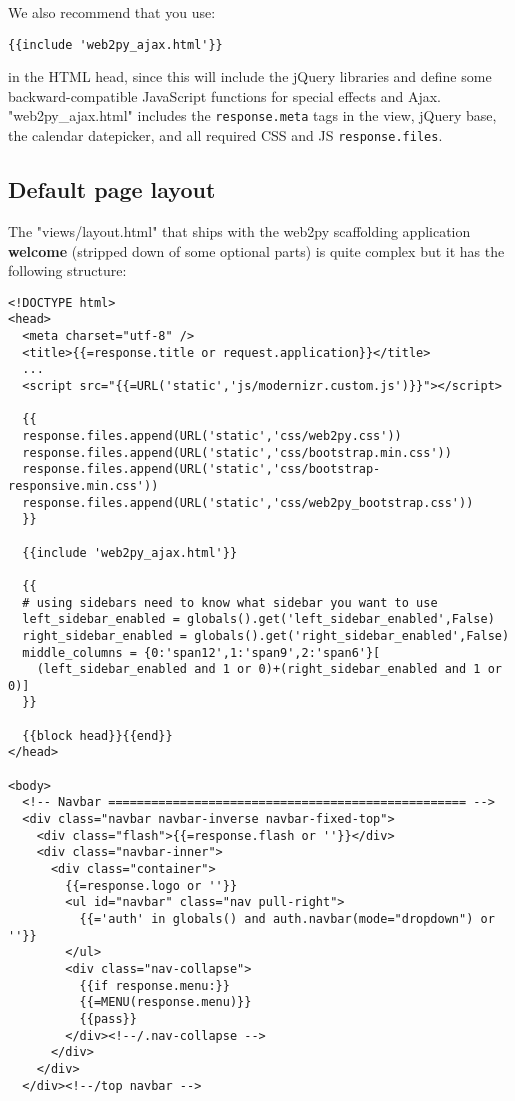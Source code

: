 \documentclass[justified,sixbynine,notoc]{tufte-book}
\def\ft{\small\tt}
\def\inxx#1{\index{#1}}
\begin{document}
\begin{fullwidth}
We also recommend that you use:

\begin{lstlisting}[keywords={}]
{{include 'web2py_ajax.html'}}
\end{lstlisting}
\noindent in the HTML head, since this will include the jQuery libraries and define some backward-compatible JavaScript functions for special effects and Ajax. "web2py\_ajax.html" includes the {\ft response.meta} tags in the view, jQuery base, the calendar datepicker, and all required CSS and JS {\ft response.files}.

\goodbreak\subsection{Default page layout}

\inxx{Twitter Bootstrap}

The "views/layout.html" that ships with the web2py scaffolding application {\bf welcome} (stripped down of some optional parts) is quite complex but it has the following structure:

\begin{lstlisting}[keywords={}]
<!DOCTYPE html>
<head>
  <meta charset="utf-8" />
  <title>{{=response.title or request.application}}</title>
  ...
  <script src="{{=URL('static','js/modernizr.custom.js')}}"></script>

  {{
  response.files.append(URL('static','css/web2py.css'))
  response.files.append(URL('static','css/bootstrap.min.css'))
  response.files.append(URL('static','css/bootstrap-responsive.min.css'))
  response.files.append(URL('static','css/web2py_bootstrap.css'))
  }}

  {{include 'web2py_ajax.html'}}

  {{
  # using sidebars need to know what sidebar you want to use
  left_sidebar_enabled = globals().get('left_sidebar_enabled',False)
  right_sidebar_enabled = globals().get('right_sidebar_enabled',False)
  middle_columns = {0:'span12',1:'span9',2:'span6'}[
    (left_sidebar_enabled and 1 or 0)+(right_sidebar_enabled and 1 or 0)]
  }}

  {{block head}}{{end}}
</head>

<body>
  <!-- Navbar ================================================== -->
  <div class="navbar navbar-inverse navbar-fixed-top">
    <div class="flash">{{=response.flash or ''}}</div>
    <div class="navbar-inner">
      <div class="container">
        {{=response.logo or ''}}
        <ul id="navbar" class="nav pull-right">
          {{='auth' in globals() and auth.navbar(mode="dropdown") or ''}}
        </ul>
        <div class="nav-collapse">
          {{if response.menu:}}
          {{=MENU(response.menu)}}
          {{pass}}
        </div><!--/.nav-collapse -->
      </div>
    </div>
  </div><!--/top navbar -->


\end{lstlisting}
\end{fullwidth}
\end{document}
